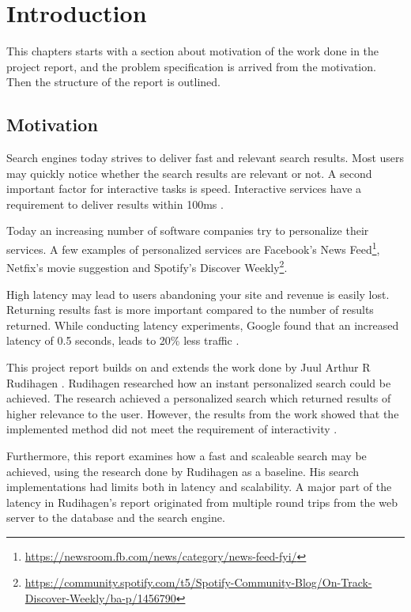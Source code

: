 \chapter{Introduction}
\label{ch:introduction}
This chapters starts with a section about motivation of the work done in the project report,
and the problem specification is arrived from the motivation.
Then the structure of the report is outlined.

\section{Motivation}
Search engines today strives to deliver fast and relevant search results.
Most users may quickly notice whether the search results are relevant or not.
A second important factor for interactive tasks is speed.
Interactive services have a requirement to deliver results within 100ms \cite{google-latency}.

Today an increasing number of software companies try to personalize their services.
A few examples of personalized services are Facebook's News Feed\footnote{\url{https://newsroom.fb.com/news/category/news-feed-fyi/}},
Netfix's movie suggestion \cite{netflix-recommendation} and Spotify's Discover Weekly\footnote{\url{https://community.spotify.com/t5/Spotify-Community-Blog/On-Track-Discover-Weekly/ba-p/1456790}}.

High latency may lead to users abandoning your site and revenue is easily lost.
Returning results fast is more important compared to the number of results returned.
While conducting latency experiments, Google found that an increased latency of 0.5 seconds, leads to 20\% less traffic \cite{google-marissa}.

This project report builds on and extends the work done by Juul Arthur R Rudihagen \cite{master-thesis}.
Rudihagen researched how an instant personalized search could be achieved.
The research achieved a personalized search which returned results of higher relevance to the user.
However, the results from the work showed that the implemented method did not meet the requirement of interactivity \cite{master-thesis}.

Furthermore, this report examines how a fast and scaleable search may be achieved, using the research done by Rudihagen as a baseline.
His search implementations had limits both in latency and scalability.
A major part of the latency in Rudihagen's report originated from multiple round trips from the web server to the database and the search engine.

